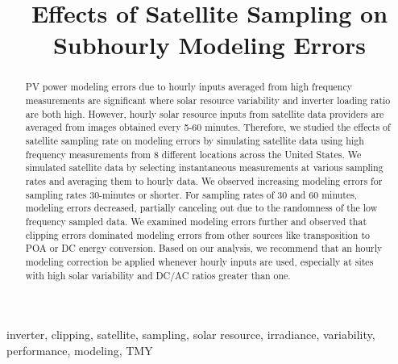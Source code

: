 \documentclass[conference]{IEEEtran}
\begin{document}
\title{Effects of Satellite Sampling on Subhourly Modeling Errors}

\author{
}

\maketitle

\begin{abstract}
PV power modeling errors due to hourly inputs averaged from high frequency measurements are significant where solar resource variability and inverter loading ratio are both high. However, hourly solar resource inputs from satellite data providers are averaged from images obtained every 5-60 minutes. Therefore, we studied the effects of satellite sampling rate on modeling errors by simulating satellite data using high frequency measurements from 8 different locations across the United States. We simulated satellite data by selecting instantaneous measurements at various sampling rates and averaging them to hourly data. We observed increasing modeling errors for sampling rates 30-minutes or shorter. For sampling rates of 30 and 60 minutes, modeling errors decreased, partially canceling out due to the randomness of the low frequency sampled data. We examined modeling errors further and observed that clipping errors dominated modeling errors from other sources like transposition to POA or DC energy conversion. Based on our analysis, we recommend that an hourly modeling correction be applied whenever hourly inputs are used, especially at sites with high solar variability and DC/AC ratios greater than one.
\end{abstract}

\begin{IEEEkeywords}
inverter, clipping, satellite, sampling, solar resource, irradiance, variability, performance, modeling, TMY
\end{IEEEkeywords}
\end{document}
